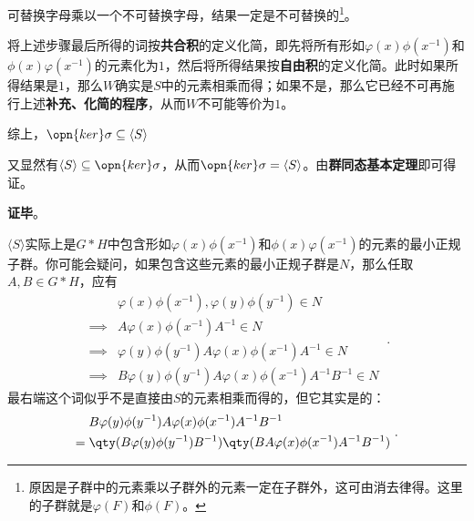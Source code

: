 可替换字母乘以一个不可替换字母，结果一定是不可替换的\footnote{原因是子群中的元素乘以子群外的元素一定在子群外，这可由消去律得。这里的子群就是$\varphi(F)$和$\phi(F)$。}。

将上述步骤最后所得的词按\textbf{共合积}的定义化简，即先将所有形如$\varphi(x)\phi(x^{-1})$和$\phi(x)\varphi(x^{-1})$的元素化为$1$，然后将所得结果按\textbf{自由积}的定义化简。此时如果所得结果是$1$，那么$W$确实是$S$中的元素相乘而得；如果不是，那么它已经不可再施行上述\textbf{补充、化简的程序}，从而$W$不可能等价为$1$。

综上，$\opn{ker}\sigma\subseteq \langle S \rangle $

又显然有$\langle S \rangle \subseteq \opn{ker}\sigma$，从而$\opn{ker}\sigma=\langle S \rangle$。由\textbf{群同态基本定理}即可得证。

\textbf{证毕}。




$\langle S \rangle$实际上是$G*H$中包含形如$\varphi(x)\phi(x^{-1})$和$\phi(x)\varphi(x^{-1})$的元素的最小正规子群。你可能会疑问，如果包含这些元素的最小正规子群是$N$，那么任取$A, B\in G*H$，应有
\begin{equation}
\begin{aligned}
&\varphi(x)\phi(x^{-1}), \varphi(y)\phi(y^{-1})\in N \\
\implies{}& A\varphi(x)\phi(x^{-1})A^{-1}\in N\\
\implies{}& \varphi(y)\phi(y^{-1})A\varphi(x)\phi(x^{-1})A^{-1}\in N\\
\implies{}& B\varphi(y)\phi(y^{-1})A\varphi(x)\phi(x^{-1})A^{-1}B^{-1}\in N
\end{aligned}
~.
\end{equation}
最右端这个词似乎不是直接由$S$的元素相乘而得的，但它其实是的：
\begin{equation}
\begin{aligned}
&B\varphi(y)\phi(y^{-1})A\varphi(x)\phi(x^{-1})A^{-1}B^{-1} \\
={}& \qty(B\varphi(y)\phi(y^{-1})B^{-1})\qty(BA\varphi(x)\phi(x^{-1})A^{-1}B^{-1})
\end{aligned}
~.
\end{equation}















